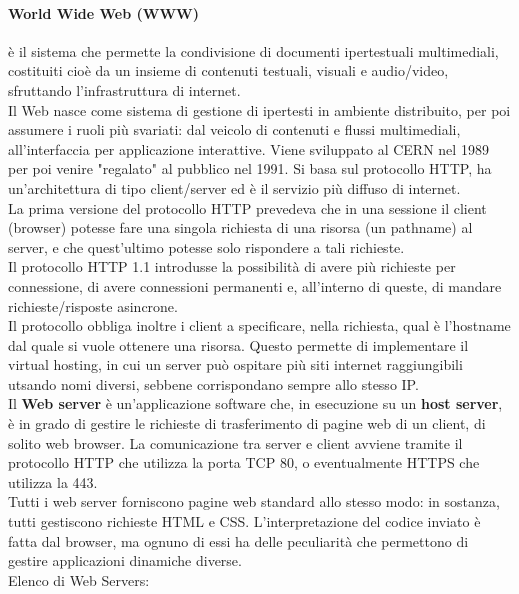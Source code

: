 \documentclass[a4paper]{report}
\begin{document}
\paragraph{World Wide Web (WWW)} è il sistema che permette la condivisione di documenti ipertestuali multimediali, costituiti cioè da un insieme di contenuti testuali, visuali e audio/video, sfruttando l'infrastruttura di internet.\\
Il Web nasce come sistema di gestione di ipertesti in ambiente distribuito, per poi assumere i ruoli più svariati: dal veicolo di contenuti e flussi multimediali, all'interfaccia per applicazione interattive. Viene sviluppato al CERN nel 1989 per poi venire "regalato" al pubblico nel 1991. Si basa sul protocollo HTTP, ha un'architettura di tipo client/server ed è il servizio più diffuso di internet.\\
La prima versione del protocollo HTTP prevedeva che in una sessione il client (browser) potesse fare una singola richiesta di una risorsa (un pathname) al server, e che quest'ultimo potesse solo rispondere a tali richieste.\\
Il protocollo HTTP 1.1 introdusse la possibilità di avere più richieste per connessione, di avere connessioni permanenti e, all'interno di queste, di mandare richieste/risposte asincrone.\\
Il protocollo obbliga inoltre i client a specificare, nella richiesta, qual è l'hostname dal quale si vuole ottenere una risorsa. Questo permette di implementare il virtual hosting, in cui un server può ospitare più siti internet raggiungibili utsando nomi diversi, sebbene corrispondano sempre allo stesso IP.\\
Il \textbf{Web server} è un'applicazione software che, in esecuzione su un \textbf{host server}, è in grado di gestire le richieste di trasferimento di pagine web di un client, di solito web browser. La comunicazione tra server e client avviene tramite il protocollo HTTP che utilizza la porta TCP 80, o eventualmente HTTPS che utilizza la 443.\\
Tutti i web server forniscono pagine web standard allo stesso modo: in sostanza, tutti gestiscono richieste HTML e CSS. L'interpretazione del codice inviato è fatta dal browser, ma ognuno di essi ha delle peculiarità che permettono di gestire applicazioni dinamiche diverse.\\
Elenco di Web Servers:
\end{document}
